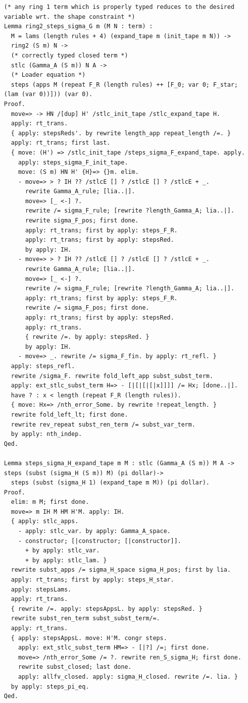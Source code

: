 \begin{lstlisting}
(* any ring 1 term which is properly typed reduces to the desired variable wrt. the shape constraint *)
Lemma ring2_steps_sigma_G m (M N : term) :
  M = lams (length rules + 4) (expand_tape m (init_tape m N)) ->
  ring2 (S m) N ->
  (* correctly typed closed term *)
  stlc (Gamma_A (S m)) N A ->
  (* Loader equation *)
  steps (apps M (repeat F_R (length rules) ++ [F_0; var 0; F_star; (lam (var 0))])) (var 0).
Proof.
  move=> -> HN /[dup] H' /stlc_init_tape /stlc_expand_tape H.
  apply: rt_trans.
  { apply: stepsReds'. by rewrite length_app repeat_length /=. }
  apply: rt_trans; first last.
  { move: (H') => /stlc_init_tape /steps_sigma_F_expand_tape. apply.
    apply: steps_sigma_F_init_tape.
    move: (S m) HN H' {H}=> {}m. elim.
    - move=> > ? IH ?? /stlcE [] ? /stlcE [] ? /stlcE + _.
      rewrite Gamma_A_rule; [lia..|].
      move=> [_ <-] ?.
      rewrite /= sigma_F_rule; [rewrite ?length_Gamma_A; lia..|].
      rewrite sigma_F_pos; first done.
      apply: rt_trans; first by apply: steps_F_R.
      apply: rt_trans; first by apply: stepsRed.
      by apply: IH.
    - move=> > ? IH ?? /stlcE [] ? /stlcE [] ? /stlcE + _.
      rewrite Gamma_A_rule; [lia..|].
      move=> [_ <-] ?.
      rewrite /= sigma_F_rule; [rewrite ?length_Gamma_A; lia..|].
      apply: rt_trans; first by apply: steps_F_R.
      rewrite /= sigma_F_pos; first done.
      apply: rt_trans; first by apply: stepsRed.
      apply: rt_trans.
      { rewrite /=. by apply: stepsRed. }
      by apply: IH.
    - move=> _. rewrite /= sigma_F_fin. by apply: rt_refl. }
  apply: steps_refl.
  rewrite /sigma_F. rewrite fold_left_app subst_subst_term.
  apply: ext_stlc_subst_term H=> - [|[|[|[|x]]]] /= Hx; [done..|].
  have ? : x < length (repeat F_R (length rules)).
  { move: Hx=> /nth_error_Some. by rewrite !repeat_length. }
  rewrite fold_left_lt; first done.
  rewrite rev_repeat subst_ren_term /= subst_var_term.
  by apply: nth_indep.
Qed.

Lemma steps_sigma_H_expand_tape m M : stlc (Gamma_A (S m)) M A -> steps (subst (sigma_H (S m)) M) (pi dollar)->
  steps (subst (sigma_H 1) (expand_tape m M)) (pi dollar).
Proof.
  elim: m M; first done.
  move=> m IH M HM H'M. apply: IH.
  { apply: stlc_apps.
    - apply: stlc_var. by apply: Gamma_A_space.
    - constructor; [|constructor; [|constructor]].
      + by apply: stlc_var.
      + by apply: stlc_lam. }
  rewrite subst_apps /= sigma_H_space sigma_H_pos; first by lia.
  apply: rt_trans; first by apply: steps_H_star.
  apply: stepsLams.
  apply: rt_trans.
  { rewrite /=. apply: stepsAppsL. by apply: stepsRed. }
  rewrite subst_ren_term subst_subst_term/=.
  apply: rt_trans.
  { apply: stepsAppsL. move: H'M. congr steps.
    apply: ext_stlc_subst_term HM=> - [|?] /=; first done.
    move=> /nth_error_Some /= ?. rewrite ren_S_sigma_H; first done.
    rewrite subst_closed; last done.
    apply: allfv_closed. apply: sigma_H_closed. rewrite /=. lia. }
  by apply: steps_pi_eq.
Qed.


\end{lstlisting}
